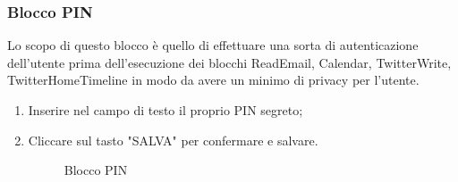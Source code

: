 \subsubsection{Blocco PIN}
Lo scopo di questo blocco è quello di effettuare una sorta di autenticazione dell'utente prima dell'esecuzione dei blocchi ReadEmail, Calendar, TwitterWrite, TwitterHomeTimeline in modo da avere un minimo di privacy per l'utente.
\begin{enumerate}
	\item Inserire nel campo di testo il proprio PIN segreto;
	\item Cliccare sul tasto "SALVA" per confermare e salvare.
	
	\begin{figure}[!ht]
		\centering
		\caption{Blocco PIN}
	\end{figure}
\end{enumerate}
\newpage

